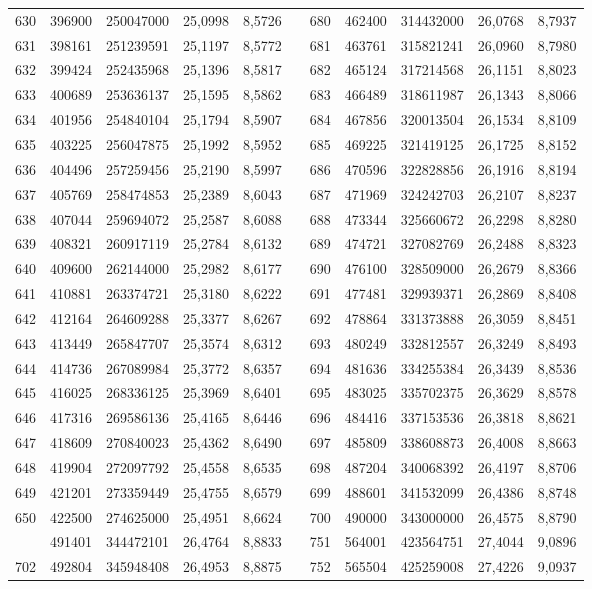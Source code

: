 \begin{longtable}{rrrrrrrrrrr}
630&396900&250047000&25,0998&8,5726&&680&462400&314432000&26,0768&8,7937\\
631&398161&251239591&25,1197&8,5772&&681&463761&315821241&26,0960&8,7980\\
632&399424&252435968&25,1396&8,5817&&682&465124&317214568&26,1151&8,8023\\
633&400689&253636137&25,1595&8,5862&&683&466489&318611987&26,1343&8,8066\\
634&401956&254840104&25,1794&8,5907&&684&467856&320013504&26,1534&8,8109\\
635&403225&256047875&25,1992&8,5952&&685&469225&321419125&26,1725&8,8152\\
636&404496&257259456&25,2190&8,5997&&686&470596&322828856&26,1916&8,8194\\
637&405769&258474853&25,2389&8,6043&&687&471969&324242703&26,2107&8,8237\\
638&407044&259694072&25,2587&8,6088&&688&473344&325660672&26,2298&8,8280\\
639&408321&260917119&25,2784&8,6132&&689&474721&327082769&26,2488&8,8323\\
640&409600&262144000&25,2982&8,6177&&690&476100&328509000&26,2679&8,8366\\
641&410881&263374721&25,3180&8,6222&&691&477481&329939371&26,2869&8,8408\\
642&412164&264609288&25,3377&8,6267&&692&478864&331373888&26,3059&8,8451\\
643&413449&265847707&25,3574&8,6312&&693&480249&332812557&26,3249&8,8493\\
644&414736&267089984&25,3772&8,6357&&694&481636&334255384&26,3439&8,8536\\
645&416025&268336125&25,3969&8,6401&&695&483025&335702375&26,3629&8,8578\\
646&417316&269586136&25,4165&8,6446&&696&484416&337153536&26,3818&8,8621\\
647&418609&270840023&25,4362&8,6490&&697&485809&338608873&26,4008&8,8663\\
648&419904&272097792&25,4558&8,6535&&698&487204&340068392&26,4197&8,8706\\
649&421201&273359449&25,4755&8,6579&&699&488601&341532099&26,4386&8,8748\\
650&422500&274625000&25,4951&8,6624&&700&490000&343000000&26,4575&8,8790\\
\newpage
701&491401&344472101&26,4764&8,8833&&751&564001&423564751&27,4044&9,0896\\
702&492804&345948408&26,4953&8,8875&&752&565504&425259008&27,4226&9,0937\\

\end{longtable}
